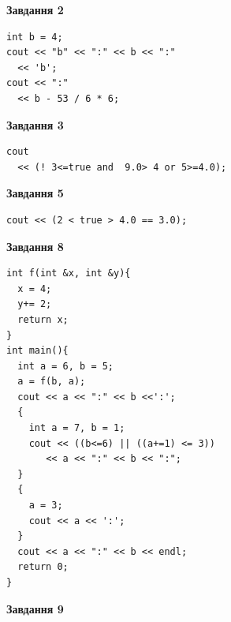 \documentclass[12pt, ukrainian]{article}
\begin{document}
{\begin {large}
\begin{minipage}[t]{7.0cm}
\end{minipage}
\vline \hspace{1mm}
\begin{minipage}[t]{11.0cm}

\begin{center}
\textbf{Завдання 2}
\end{center}
\vspace{-8mm}

\begin{verbatim}
int b = 4;
cout << "b" << ":" << b << ":" 
  << 'b';
cout << ":" 
  << b - 53 / 6 * 6;
\end{verbatim}



\begin{center}
\textbf{Завдання 3}
\end{center}
\vspace{-8mm}

\begin{verbatim}
cout 
  << (! 3<=true and  9.0> 4 or 5>=4.0);
\end{verbatim}



\begin{center}
\textbf{Завдання 5}
\end{center}
\vspace{-8mm}

\begin{verbatim}
cout << (2 < true > 4.0 == 3.0);
\end{verbatim}



\begin{center}
\textbf{Завдання 8}
\end{center}
\vspace{-8mm}

\begin{verbatim}
int f(int &x, int &y){
  x = 4;
  y+= 2;
  return x;
}
int main(){
  int a = 6, b = 5;
  a = f(b, a);
  cout << a << ":" << b <<':';
  {
    int a = 7, b = 1;
    cout << ((b<=6) || ((a+=1) <= 3))
       << a << ":" << b << ":";
  }
  {
    a = 3;
    cout << a << ':';
  }
  cout << a << ":" << b << endl;
  return 0;
}
\end{verbatim}

\end{minipage}


\begin{minipage}[t]{7.0cm}

\begin{center}
\textbf{Завдання 9}
\end{center}
\vspace{-8mm}


\end{minipage}
\end{large}}
\end{document}

